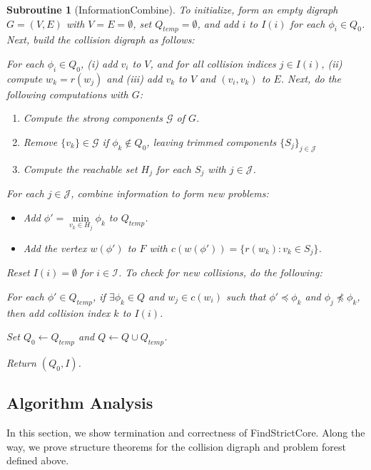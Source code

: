 \documentclass[11pt,reqno]{amsart}
\newtheorem{subroutine}[thm]{Subroutine}
\theoremstyle{definition}
\numberwithin{equation}{section}
\newcommand{\pre}{\phi}
\newcommand{\peq}{\preceq}
\newcommand{\strongc}{\mathcal{G}}
\newcommand{\strongcomp}{S}
\newcommand{\acto}{Q_0}
\newcommand{\act}{Q}
\newcommand{\actt}{Q_{temp}}
\newcommand{\coll}{I}
\newcommand{\reach}{H}
\newcommand{\forest}{F}
\begin{document}
\begin{subroutine}[InformationCombine] \label{sub:infcomb}
To initialize, form an empty digraph $G = (V,E)$ with $V = E = \emptyset$, set $\actt = \emptyset$, and add $i$ to $\coll(i)$ for each $\pre_i \in \acto$.
Next, build the collision digraph as follows: 

For each $\pre_i \in \acto$, (i) add $v_i$ to $V$, and for all collision indices $j \in \coll(i)$, (ii) compute $w_k = r(w_j)$ and (iii) add  $v_k$ to $V$ and $(v_i,v_k)$ to $E$. 
Next, do the following computations with $G$:
\begin{enumerate}
\item Compute the strong components $\strongc$ of $G$.
\item Remove $\{v_k \} \in \strongc$ if $\pre_k \not \in \acto$, leaving trimmed components $\{S_j\}_{j \in \mathcal{J}}$
\item Compute the reachable set $\reach_j$ for each $\strongcomp_j$ with $j \in \mathcal{J}$.
\end{enumerate}

For each $j \in \mathcal{J}$, combine information to form new problems:

\begin{itemize}
\item[(a)] Add $\pre' = \min\limits_{v_k \in \reach_j} \pre_k$ to $\actt$. 
\item[(b)] Add the vertex $w(\pre')$ to $\forest$ with $c(w(\pre')) = \{r(w_k): v_k \in \strongcomp_j\}$.
\end{itemize}

Reset $\coll(i) = \emptyset$ for $i \in \mathcal{I}$. 
To check for new collisions, do the following:

For each $\pre' \in \actt$, if $\exists \pre_k \in \act$ and $w_j \in c(w_i)$ such that $\pre' \peq \pre_k$ and $\pre_j \not \peq \pre_k$, then add collision index $k$ to $\coll(i)$.

Set $\acto \leftarrow \actt$ and $\act \leftarrow \act \cup \actt$.

Return $(\acto, \coll)$.
\end{subroutine}

\subsection{Algorithm Analysis}

In this section, we show termination and correctness of FindStrictCore.
Along the way, we prove structure theorems for the collision digraph and problem forest defined above.
\end{document}
